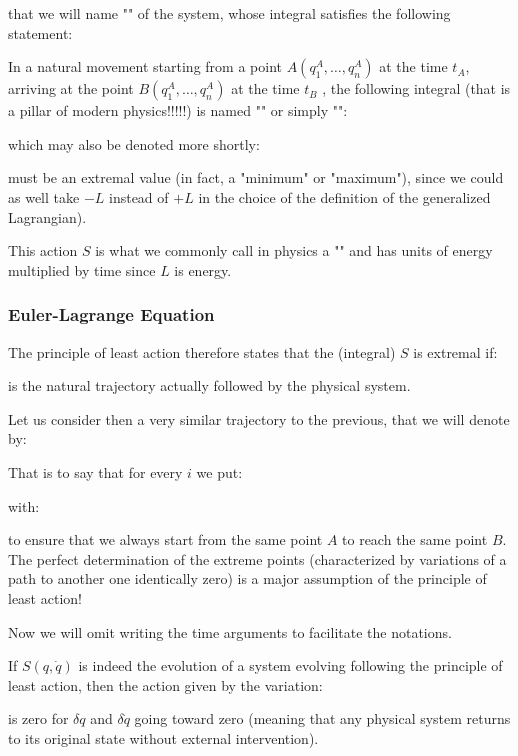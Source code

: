 	that we will name "" of the system, whose integral satisfies the following statement:

	In a natural movement starting from a point $A(q_1^A,\ldots,q_n^A)$ at the time $t_A$, arriving at the point $B(q_1^A,\ldots,q_n^A)$ at the time $t_B$ , the following integral (that is a pillar of modern physics!!!!!) is named "" or simply "":
	
	which may also be denoted more shortly:
	
	must be an extremal value (in fact, a "minimum" or "maximum"), since we could as well take $-L$ instead of $+L$ in the choice of the definition of the generalized Lagrangian).
	
	This action $S$ is what we commonly call in physics a "" and has units of energy multiplied by time since $L$ is energy.
	
	\subsubsection{Euler-Lagrange Equation}
	The principle of least action therefore states that the (integral) $S$ is extremal if:
	
	is the natural trajectory actually followed by the physical system.
	
	Let us consider then a very similar trajectory to the previous, that we will denote by:
	
	That is to say that for every $i$ we put:
	
	with:
	
	to ensure that we always start from the same point $A$ to reach the same point $B$. The perfect determination of the extreme points (characterized by variations of a path to another one identically zero) is a major assumption of the principle of least action!
	\begin{tcolorbox}[title=Remark,colframe=black,arc=10pt]
	Now we will omit writing the time arguments to facilitate the notations.
	\end{tcolorbox}
	If $S(q,\dot{q})$ is indeed the evolution of a system evolving following the principle of least action, then the action given by the variation:
	
	is zero for $\delta q$ and $\delta \dot{q}$ going toward zero (meaning that any physical system returns to its original state without external intervention).
	
